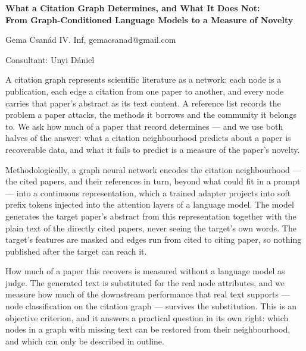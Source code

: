 \documentclass[12pt]{article}
\begin{document}
\begin{center}
    {\Large\bfseries What a Citation Graph Determines, and What It Does Not: \\
    From Graph-Conditioned Language Models to a Measure of Novelty}
\end{center}

\vspace{0.8em}

\begin{center}
    Gema Csanád IV. Inf, gemacsanad@gmail.com \\

\end{center}

\vspace{0.4em}

\begin{center}
    Consultant: Unyi Dániel
\end{center}

\vspace{1.2em}


A citation graph represents scientific literature as a network: each
node is a publication, each edge a citation from one paper to
another, and every node carries that paper's abstract as its text
content. A reference list records the problem a paper attacks, the
methods it borrows and the community it belongs to. We ask how much
of a paper that record determines — and we use both halves of the
answer: what a citation neighbourhood predicts about a paper is
recoverable data, and what it fails to predict is a measure of the
paper's novelty.

Methodologically, a graph neural network encodes the citation
neighbourhood — the cited papers, and their references in turn,
beyond what could fit in a prompt — into a continuous representation,
which a trained adapter projects into soft prefix tokens injected
into the attention layers of a language model. The model generates
the target paper's abstract from this representation together with
the plain text of the directly cited papers, never seeing the
target's own words. The target's features are masked and edges run
from cited to citing paper, so nothing published after the target can
reach it.

How much of a paper this recovers is measured without a language
model as judge. The generated text is substituted for the real node
attributes, and we measure how much of the downstream performance
that real text supports — node classification on the citation graph —
survives the substitution. This is an objective criterion, and it
answers a practical question in its own right: which nodes in a graph
with missing text can be restored from their neighbourhood, and which
can only be described in outline.
\end{document}
